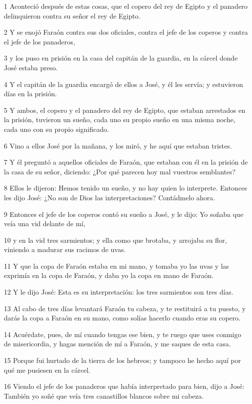 \par 1 Aconteció después de estas cosas, que el copero del rey de Egipto y el panadero delinquieron contra su señor el rey de Egipto.
\par 2 Y se enojó Faraón contra sus dos oficiales, contra el jefe de los coperos y contra el jefe de los panaderos,
\par 3 y los puso en prisión en la casa del capitán de la guardia, en la cárcel donde José estaba preso.
\par 4 Y el capitán de la guardia encargó de ellos a José, y él les servía; y estuvieron días en la prisión.
\par 5 Y ambos, el copero y el panadero del rey de Egipto, que estaban arrestados en la prisión, tuvieron un sueño, cada uno su propio sueño en una misma noche, cada uno con su propio significado.
\par 6 Vino a ellos José por la mañana, y los miró, y he aquí que estaban tristes.
\par 7 Y él preguntó a aquellos oficiales de Faraón, que estaban con él en la prisión de la casa de su señor, diciendo: ¿Por qué parecen hoy mal vuestros semblantes?
\par 8 Ellos le dijeron: Hemos tenido un sueño, y no hay quien lo interprete. Entonces les dijo José: ¿No son de Dios las interpretaciones? Contádmelo ahora.
\par 9 Entonces el jefe de los coperos contó su sueño a José, y le dijo: Yo soñaba que veía una vid delante de mí,
\par 10 y en la vid tres sarmientos; y ella como que brotaba, y arrojaba su flor, viniendo a madurar sus racimos de uvas.
\par 11 Y que la copa de Faraón estaba en mi mano, y tomaba yo las uvas y las exprimía en la copa de Faraón, y daba yo la copa en mano de Faraón.
\par 12 Y le dijo José: Esta es su interpretación: los tres sarmientos son tres días.
\par 13 Al cabo de tres días levantará Faraón tu cabeza, y te restituirá a tu puesto, y darás la copa a Faraón en su mano, como solías hacerlo cuando eras su copero.
\par 14 Acuérdate, pues, de mí cuando tengas ese bien, y te ruego que uses conmigo de misericordia, y hagas mención de mí a Faraón, y me saques de esta casa.
\par 15 Porque fui hurtado de la tierra de los hebreos; y tampoco he hecho aquí por qué me pusiesen en la cárcel.
\par 16 Viendo el jefe de los panaderos que había interpretado para bien, dijo a José: También yo soñé que veía tres canastillos blancos sobre mi cabeza.
